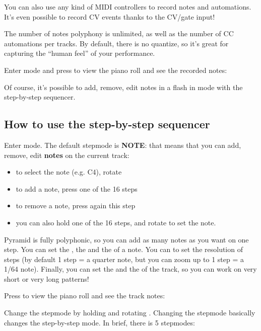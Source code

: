 You can also use any kind of MIDI controllers to record notes and automations. It's even possible to record CV events thanks to the CV/gate input!

The number of notes polyphony is unlimited, as well as the number of CC automations per tracks. By default, there is no quantize, so it's great for capturing the ``human feel'' of your performance.

Enter  mode and press  to view the piano roll and see the recorded notes:


Of course, it's possible to add, remove, edit notes in a flash in  mode with the step-by-step sequencer.


\subsection{How to use the step-by-step sequencer}

Enter  mode. The default stepmode is \textbf{NOTE}: that means that you can add, remove, edit \textbf{notes} on the current track:

\begin{itemize}
\item to select the note (e.g. C4), rotate \encodericon{}
\item to add a note, press one of the 16 steps \stepbystepicon{}
\item to remove a note, press again this step \stepbystepicon{}
\item you can also hold one of the 16 steps, and rotate \encodericon{} to set the note.
\end{itemize}

Pyramid is fully polyphonic, so you can add as many notes as you want on one step. You can set the , the  and the  of a note. You can  to set the resolution of steps (by default 1 step = a quarter note, but you can zoom up to 1 step = a 1/64 note). Finally, you can set the  and the  of the track, so you can work on very short or very long patterns!

Press  to view the piano roll and see the track notes:


Change the stepmode by holding  and rotating \encodericon{}. Changing the stepmode basically changes the step-by-step mode. In brief, there is 5 stepmodes:

